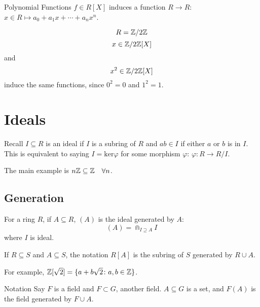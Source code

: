 \documentclass[a4paper,twoside,master.tex]{subfiles}
\begin{document}
\begin{note}{Polynomial Functions}
    $ f \in R[X] $ induces a function $ R \to R $: $ x \in R \mapsto a_0 + a_1 x + \cdots + a_n x^n $.
\end{note}

\begin{ex}
    \begin{equation}
        R = \mathbb{Z}/2\mathbb{Z}
    \end{equation}
    \begin{equation}
        x \in \mathbb{Z}/2\mathbb{Z}[X]
    \end{equation}
    and
    \begin{equation}
        x^2 \in \mathbb{Z}/2\mathbb{Z}[X]
    \end{equation}
    induce the same functions, since $ 0^2 = 0 $ and $ 1^2 = 1 $.
\end{ex}

\section{Ideals}
\label{sec:ideals}

Recall $ I \subseteq R $ is an ideal if $ I $ is a subring of $ R $ and $ a b \in I $ if either $ a $ or $ b $ is in $ I $. This is equivalent to saying $ I = \text{ker} \varphi $ for some morphism $ \varphi $: $ \varphi \colon R \to R/I $.

\begin{ex}
    The main example is $ n\mathbb{Z} \subseteq \mathbb{Z} \quad\forall n $.
\end{ex}

\subsection{Generation}
\label{sub:generation}

For a ring $ R $, if $ A \subseteq R $, $ (A) $ is the ideal generated by $ A $: 
\begin{equation}
    (A)= \Cap_{I\supseteq A} I
\end{equation}
where $ I $ is ideal.

If $ R \subseteq S $ and $ A \subseteq S $, the notation $ R[A] $ is the subring of $ S $ generated by $ R \cup A $. 

For example, $ \mathbb{Z}[\sqrt{2}] = \{a + b \sqrt{2} \colon a,b \in \mathbb{Z}\} $.

\begin{note}{Notation}
    Say $ F $ is a field and $ F \subset G $, another field. $ A \subseteq G $ is a set, and $ F(A) $ is the field generated by $ F \cup A $.
\end{note}
\end{document}

